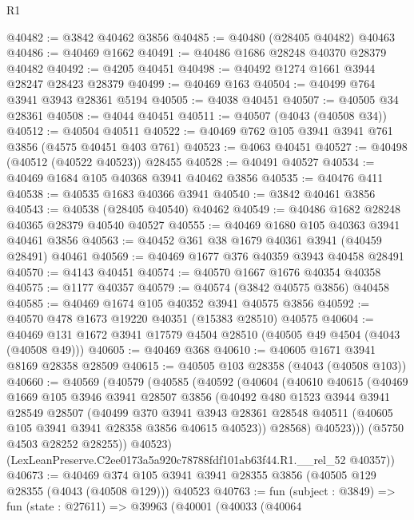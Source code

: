 \begin{lexlean}{R1}
\begin{coremodule}
@40482 := @3842 @40462 @3856
@40485 := @40480 (@28405 @40482) @40463
@40486 := @40469 @1662
@40491 := @40486 @1686 @28248 @40370 @28379 @40482
@40492 := @4205 @40451
@40498 := @40492 @1274 @1661 @3944 @28247 @28423 @28379
@40499 := @40469 @163
@40504 := @40499 @764 @3941 @3943 @28361 @5194
@40505 := @4038 @40451
@40507 := @40505 @34 @28361
@40508 := @4044 @40451
@40511 := @40507 (@4043 (@40508 @34))
@40512 := @40504 @40511
@40522 := @40469 @762 @105 @3941 @3941 @761 @3856 (@4575 @40451 @403 @761)
@40523 := @4063 @40451
@40527 := @40498 (@40512 (@40522 @40523)) @28455
@40528 := @40491 @40527
@40534 := @40469 @1684 @105 @40368 @3941 @40462 @3856
@40535 := @40476 @411
@40538 := @40535 @1683 @40366 @3941
@40540 := @3842 @40461 @3856
@40543 := @40538 (@28405 @40540) @40462
@40549 := @40486 @1682 @28248 @40365 @28379 @40540 @40527
@40555 := @40469 @1680 @105 @40363 @3941 @40461 @3856
@40563 := @40452 @361 @38 @1679 @40361 @3941 (@40459 @28491) @40461
@40569 := @40469 @1677 @376 @40359 @3943 @40458 @28491
@40570 := @4143 @40451
@40574 := @40570 @1667 @1676 @40354 @40358
@40575 := @1177 @40357
@40579 := @40574 (@3842 @40575 @3856) @40458
@40585 := @40469 @1674 @105 @40352 @3941 @40575 @3856
@40592 := @40570 @478 @1673 @19220 @40351 (@15383 @28510) @40575
@40604 := @40469 @131 @1672 @3941 @17579 @4504 @28510 (@40505 @49 @4504 (@4043 (@40508 @49)))
@40605 := @40469 @368
@40610 := @40605 @1671 @3941 @8169 @28358 @28509
@40615 := @40505 @103 @28358 (@4043 (@40508 @103))
@40660 := @40569
    (@40579
      (@40585
        (@40592
          (@40604
            (@40610
              @40615
              (@40469
                @1669
                @105
                @3946
                @3941
                @28507
                @3856
                (@40492
                  @480
                  @1523
                  @3944
                  @3941
                  @28549
                  @28507
                  (@40499
                    @370
                    @3941
                    @3943
                    @28361
                    @28548
                    @40511
                    (@40605 @105 @3941 @3941 @28358 @3856 @40615 @40523))
                  @28568)
                @40523)))
          (@5750 @4503 @28252 @28255))
        @40523)
      (LexLeanPreserve.C2ee0173a5a920c78788fdf101ab63f44.R1.__rel_52 @40357))
@40673 := @40469
    @374
    @105
    @3941
    @3941
    @28355
    @3856
    (@40505 @129 @28355 (@4043 (@40508 @129)))
    @40523
@40763 := fun (subject : @3849) =>
  fun (state : @27611) =>
  @39963
    (@40001
      (@40033
        (@40064

\end{coremodule}
\end{lexlean}
